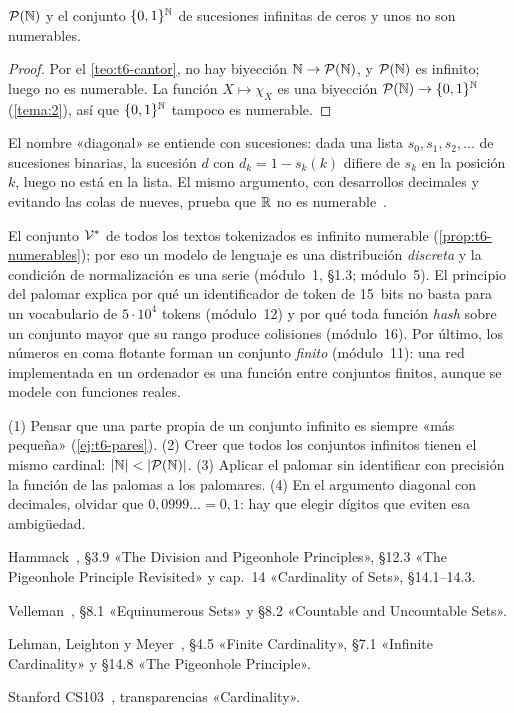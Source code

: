 \begin{corolario}\label{cor:t6-nonum}
$\mathcal{P}(\mathbb{N})$ y el conjunto $\{0,1\}^{\mathbb{N}}$ de sucesiones infinitas de ceros y unos no son numerables.
\end{corolario}

\begin{proof}
Por el \cref{teo:t6-cantor}, no hay biyección $\mathbb{N}\to\mathcal{P}(\mathbb{N})$, y $\mathcal{P}(\mathbb{N})$ es infinito; luego no es numerable. La función $X\mapsto\chi_X$ es una biyección $\mathcal{P}(\mathbb{N})\to\{0,1\}^{\mathbb{N}}$ (\cref{tema:2}), así que $\{0,1\}^{\mathbb{N}}$ tampoco es numerable.
\end{proof}

El nombre «diagonal» se entiende con sucesiones: dada una lista $s_0,s_1,s_2,\dots$ de sucesiones binarias, la sucesión $d$ con $d_k=1-s_k(k)$ difiere de $s_k$ en la posición $k$, luego no está en la lista. El mismo argumento, con desarrollos decimales y evitando las colas de nueves, prueba que $\mathbb{R}$ no es numerable~\cite[§14.2]{hammack}.

\begin{observacion}
El conjunto $\mathcal{V}^{*}$ de todos los textos tokenizados es infinito numerable (\cref{prop:t6-numerables}); por eso un modelo de lenguaje es una distribución \emph{discreta} y la condición de normalización es una serie (módulo~1, §1.3; módulo~5). El principio del palomar explica por qué un identificador de token de 15~bits no basta para un vocabulario de $5\cdot10^{4}$ tokens (módulo~12) y por qué toda función \emph{hash} sobre un conjunto mayor que su rango produce colisiones (módulo~16). Por último, los números en coma flotante forman un conjunto \emph{finito} (módulo~11): una red implementada en un ordenador es una función entre conjuntos finitos, aunque se modele con funciones reales.
\end{observacion}

\begin{observacion}
(1) Pensar que una parte propia de un conjunto infinito es siempre «más pequeña» (\cref{ej:t6-pares}). (2) Creer que todos los conjuntos infinitos tienen el mismo cardinal: $\lvert\mathbb{N}\rvert<\lvert\mathcal{P}(\mathbb{N})\rvert$. (3) Aplicar el palomar sin identificar con precisión la función de las palomas a los palomares. (4) En el argumento diagonal con decimales, olvidar que $0{,}0999\ldots=0{,}1$: hay que elegir dígitos que eviten esa ambigüedad.
\end{observacion}

\begin{lecturas}
\item Hammack~\cite{hammack}, §3.9 «The Division and Pigeonhole Principles», §12.3 «The Pigeonhole Principle Revisited» y cap.~14 «Cardinality of Sets», §14.1–14.3.
\item Velleman~\cite{velleman}, §8.1 «Equinumerous Sets» y §8.2 «Countable and Uncountable Sets».
\item Lehman, Leighton y Meyer~\cite{mcs}, §4.5 «Finite Cardinality», §7.1 «Infinite Cardinality» y §14.8 «The Pigeonhole Principle».
\item Stanford CS103~\cite{cs103card}, transparencias «Cardinality».
\end{lecturas}

